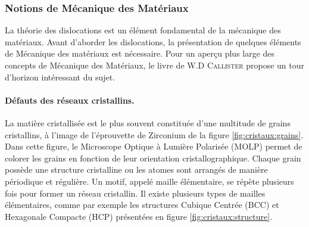 \documentclass[11pt,class=article,float=false,crop=false]{standalone}
\begin{document}
\subsubsection{Notions de Mécanique des Matériaux}

La théorie des dislocations est un élément fondamental de la mécanique des matériaux. Avant d'aborder les dislocations, la présentation de quelques éléments de Mécanique des matériaux est nécessaire. Pour un aperçu plus large des concepts de Mécanique des Matériaux, le livre de W.D \textsc{Callister}  propose un tour d'horizon intéressant du sujet.

\paragraph{Défauts des réseaux cristallins.}

La matière cristallisée est le plus souvent constituée d'une multitude de grains cristallins, à l'image de l'éprouvette de Zirconium de la figure \ref{fig:cristaux:grains}. Dans cette figure, le Microscope Optique à Lumière Polarisée (MOLP) permet de colorer les grains en fonction de leur orientation cristallographique. Chaque grain possède une structure cristalline ou les atomes sont arrangés de manière périodique et régulière. Un motif, appelé maille élémentaire, se répète plusieurs fois pour former un réseau cristallin. Il existe plusieurs types de mailles élémentaires, comme par exemple les structures Cubique Centrée (BCC) et Hexagonale Compacte (HCP) présentées en figure \ref{fig:cristaux:structure}. 
\end{document}
